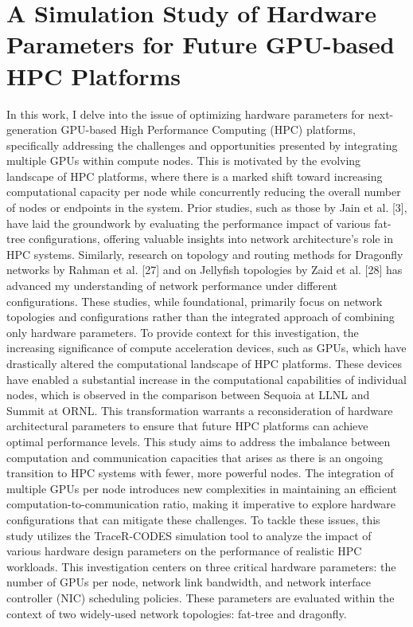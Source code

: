 \chapter{A Simulation Study of Hardware Parameters for Future GPU-based HPC Platforms}

 In this work, I delve into the issue of optimizing hardware parameters for next-generation GPU-based High Performance Computing (HPC) platforms, specifically addressing the challenges and opportunities presented by integrating multiple GPUs within compute nodes. This is motivated by the evolving landscape of HPC platforms, where there is a marked shift toward increasing computational capacity per node while concurrently reducing the overall number of nodes or endpoints in the system.
Prior studies, such as those by Jain et al. [3], have laid the groundwork by evaluating the performance impact of various fat-tree configurations, offering valuable insights into network architecture's role in HPC systems. Similarly, research on topology and routing methods for Dragonfly networks by Rahman et al. [27] and on Jellyfish topologies by Zaid et al. [28] has advanced my understanding of network performance under different configurations. These studies, while foundational, primarily focus on network topologies and configurations rather than the integrated approach of combining only hardware parameters.
To provide context for this investigation, the increasing significance of compute acceleration devices, such as GPUs, which have drastically altered the computational landscape of HPC platforms. These devices have enabled a substantial increase in the computational capabilities of individual nodes, which is observed in the comparison between Sequoia at LLNL and Summit at ORNL. This transformation warrants a reconsideration of hardware architectural parameters to ensure that future HPC platforms can achieve optimal performance levels.
This study aims to address the imbalance between computation and communication capacities that arises as there is an ongoing transition to HPC systems with fewer, more powerful nodes. The integration of multiple GPUs per node introduces new complexities in maintaining an efficient computation-to-communication ratio, making it imperative to explore hardware configurations that can mitigate these challenges.
To tackle these issues, this study utilizes the TraceR-CODES simulation tool to analyze the impact of various hardware design parameters on the performance of realistic HPC workloads. This investigation centers on three critical hardware parameters: the number of GPUs per node, network link bandwidth, and network interface controller (NIC) scheduling policies. These parameters are evaluated within the context of two widely-used network topologies: fat-tree and dragonfly.

